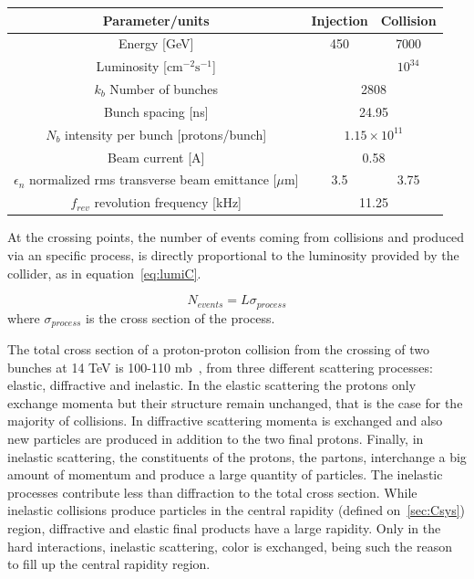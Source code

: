 \begin{table}[htbH]
\label{tab:LHCparams}
\begin{center}
\begin{tabular}{|c|c c|}
\hline 
Parameter/units & Injection & Collision \\
\hline
Energy [GeV]& 450 & 7000 \\ 
Luminosity [$\text{cm}^{-2}\text{s}^{-1}$] & & $10^{34}$ \\
$k_{b}$ Number of bunches & \multicolumn{2}{c|}{2808} \\
Bunch spacing [ns] & \multicolumn{2}{c|}{24.95} \\
$N_{b}$ intensity per bunch [protons/bunch] & \multicolumn{2}{c|}{$1.15\times 10^{11}$} \\
Beam current [A] & \multicolumn{2}{c|}{0.58} \\
$\epsilon_{n}$ normalized rms transverse beam emittance [$\mu$m] & 3.5 & 3.75 \\ 
$f_{rev}$ revolution frequency [kHz] & \multicolumn{2}{c|}{11.25} \\
\hline
\end{tabular}
\end{center}
\end{table}

At the crossing points, the number of events coming from collisions and produced via an specific process, is directly proportional to the luminosity provided by the collider, as in equation~\ref{eq:lumiC}.

\begin{equation}
  \label{eq:lumiN}
  N_{events}=L\sigma_{process}
\end{equation} where $\sigma_{process}$ is the cross section of the process. 

The total cross section of a proton-proton collision from the crossing of two bunches at 14 TeV is 100-110 mb~\cite{Augier:1993ta}, from three different scattering processes: elastic, diffractive and inelastic. In the elastic scattering the protons only exchange momenta but their structure remain unchanged, that is the case for the majority of collisions. In diffractive scattering momenta is exchanged and also new particles are produced in addition to the two final protons. Finally, in inelastic scattering, the constituents of the protons, the partons, interchange a big amount of momentum and produce a large quantity of particles. The inelastic processes contribute less than diffraction to the total cross section. While inelastic collisions produce particles in the central rapidity (defined on~\ref{sec:Csys}) region, diffractive and elastic final products have a large rapidity. Only in the hard interactions, inelastic scattering, color is exchanged, being such the reason to fill up the central rapidity region. 

